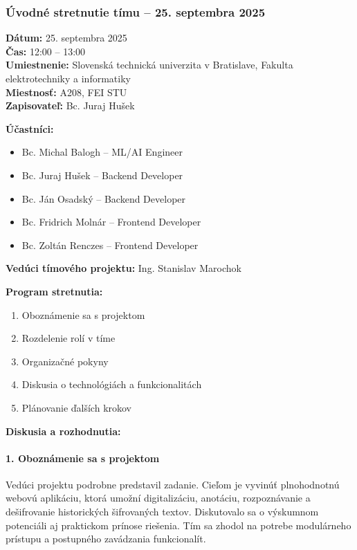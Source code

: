 \subsubsection{Úvodné stretnutie tímu – 25. septembra 2025}

\textbf{Dátum:} 25. septembra 2025 \\
\textbf{Čas:} 12:00 – 13:00 \\
\textbf{Umiestnenie:} Slovenská technická univerzita v Bratislave, Fakulta elektrotechniky a informatiky \\
\textbf{Miestnosť:} A208, FEI STU \\
\textbf{Zapisovateľ:} Bc. Juraj Hušek

\vspace{0.5cm}
\textbf{Účastníci:}
\begin{itemize}
    \item Bc. Michal Balogh – ML/AI Engineer
    \item Bc. Juraj Hušek – Backend Developer
    \item Bc. Ján Osadský – Backend Developer
    \item Bc. Fridrich Molnár – Frontend Developer
    \item Bc. Zoltán Renczes – Frontend Developer
\end{itemize}

\textbf{Vedúci tímového projektu:} Ing. Stanislav Marochok

\vspace{0.5cm}
\textbf{Program stretnutia:}
\begin{enumerate}
    \item Oboznámenie sa s projektom
    \item Rozdelenie rolí v tíme
    \item Organizačné pokyny
    \item Diskusia o technológiách a funkcionalitách
    \item Plánovanie ďalších krokov
\end{enumerate}

\vspace{0.5cm}
\textbf{Diskusia a rozhodnutia:}

\paragraph{1. Oboznámenie sa s projektom} 
Vedúci projektu podrobne predstavil zadanie. Cieľom je vyvinúť plnohodnotnú webovú aplikáciu, ktorá umožní digitalizáciu, anotáciu, rozpoznávanie a dešifrovanie historických šifrovaných textov. Diskutovalo sa o výskumnom potenciáli aj praktickom prínose riešenia. Tím sa zhodol na potrebe modulárneho prístupu a postupného zavádzania funkcionalít.

